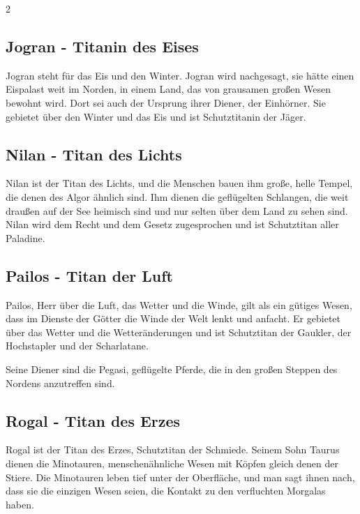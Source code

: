 \begin{multicols}{2}
{\subsection{Jogran - Titanin des Eises}\label{subsec:jogran-titanin-des-eises}

Jogran steht für das Eis und den Winter.
Jogran wird nachgesagt, sie hätte einen Eispalast weit im Norden, in einem Land, das von grausamen großen Wesen bewohnt wird.
Dort sei auch der Ursprung ihrer Diener, der Einhörner.
Sie gebietet über den Winter und das Eis und ist Schutztitanin der Jäger.

\subsection{Nilan - Titan des Lichts}\label{subsec:nilan-titan-des-lichts}

Nilan ist der Titan des Lichts, und die Menschen bauen ihm große, helle Tempel, die denen des Algor ähnlich sind.
Ihm dienen die geflügelten Schlangen, die weit draußen auf der See heimisch sind und nur selten über dem Land zu sehen sind.
Nilan wird dem Recht und dem Gesetz zugesprochen und ist Schutztitan aller Paladine.

\subsection{Pailos - Titan der Luft}\label{subsec:pailos-titan-der-luft}

Pailos, Herr über die Luft, das Wetter und die Winde, gilt als ein gütiges Wesen, dass im Dienste der Götter die Winde der Welt lenkt und anfacht.
Er gebietet über das Wetter und die Wetteränderungen und ist Schutztitan der Gaukler, der Hochstapler und der Scharlatane.

Seine Diener sind die Pegasi, geflügelte Pferde, die in den großen Steppen des Nordens anzutreffen sind.

\subsection{Rogal - Titan des Erzes}\label{subsec:rogal-titan-des-erzes}

Rogal ist der Titan des Erzes, Schutztitan der Schmiede.
Seinem Sohn Taurus dienen die Minotauren, menschenähnliche Wesen mit Köpfen gleich denen der Stiere.
Die Minotauren leben tief unter der Oberfläche, und man sagt ihnen nach, dass sie die einzigen Wesen seien, die Kontakt zu den verfluchten Morgalas haben.

}
\end{multicols}
